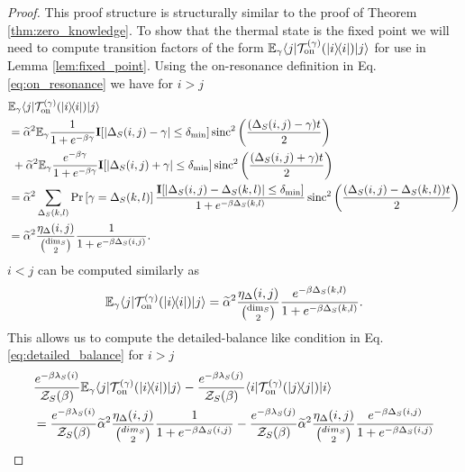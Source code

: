 \begin{proof}
This proof structure is structurally similar to the proof of Theorem \ref{thm:zero_knowledge}.
To show that the thermal state is the fixed point we will need to compute transition factors of the form $\mathbb{E}_\gamma \langle j|\mathcal{T}_{\rm on}^{(\gamma)}(| i\rangle\! \langle i|)|j\rangle$ for use in Lemma \ref{lem:fixed_point}. Using the on-resonance definition in Eq. \eqref{eq:on_resonance} we have for $i > j$
\begin{align}
    &\mathbb{E}_\gamma \langle j| \mathcal{T}_{\rm on}^{(\gamma)}(| i\rangle\! \langle i|)|j\rangle \nonumber \\
    &=  \widetilde{\alpha}^2 \mathbb{E}_{\gamma} \frac{1}{1 + e^{-\beta \gamma}} \mathbf{I}[|\Delta_S(i,j) - \gamma| \le \delta_{\min}]  \operatorname{sinc}^2\left(\frac{(\Delta_S(i,j) - \gamma)t}{2}\right) \nonumber \\
    &~+ \widetilde{\alpha}^2 \mathbb{E}_{\gamma} \frac{e^{-\beta \gamma}}{1 + e^{-\beta \gamma}} \mathbf{I}[|\Delta_S(i,j) + \gamma| \le \delta_{\min}]  \operatorname{sinc}^2\left(\frac{(\Delta_S(i,j) + \gamma)t}{2}\right) \\
    &= \widetilde{\alpha}^2 \sum_{\Delta_S(k,l)} \text{Pr}\left[ \gamma = \Delta_S(k,l) \right] \frac{\mathbf{I}[|\Delta_S(i,j) - \Delta_S(k,l)| \le \delta_{\min}]}{1 + e^{-\beta \Delta_S(k,l)}}   \operatorname{sinc}^2\left(\frac{(\Delta_S(i,j) - \Delta_S(k,l))t}{2}\right) \\
    &= \widetilde{\alpha}^2 \frac{\eta_\Delta(i,j)}{\binom{\dim_S}{2}} \frac{1}{1 + e^{-\beta \Delta_S(i,j)}}.
\end{align}
$i < j$ can be computed similarly as
\begin{equation}
    \mathbb{E}_\gamma \langle j| \mathcal{T}_{\rm on}^{(\gamma)}(| i\rangle\! \langle i|)|j\rangle = \widetilde{\alpha}^2 \frac{\eta_\Delta(i,j)}{\binom{\dim_S}{2}} \frac{e^{-\beta \Delta_S(k,l)}}{1 + e^{-\beta \Delta_S(k,l)}}.
\end{equation}
This allows us to compute the detailed-balance like condition in Eq. \eqref{eq:detailed_balance} for $i > j$
\begin{align}
    &\frac{e^{-\beta \lambda_S(i)}}{\partfun_S(\beta)} \EE_\gamma \bra{j} \TT_{\on}^{(\gamma)}(\ketbra{i}{i}) \ket{j} - \frac{e^{-\beta \lambda_S(j)}}{\partfun_S(\beta)} \bra{i} \TT_{\on}^{(\gamma)}(\ketbra{j}{j}) \ket{i} \nonumber \\
    &= \frac{e^{-\beta \lambda_S(i)}}{\partfun_S(\beta)} \widetilde{\alpha}^2 \frac{\eta_\Delta(i,j)}{\binom{dim_S}{2}} \frac{1}{1 + e^{-\beta \Delta_S(i,j)}} - \frac{e^{-\beta \lambda_S(j)}}{\partfun_S(\beta)} \widetilde{\alpha}^2 \frac{\eta_\Delta(i,j)}{\binom{dim_S}{2}} \frac{e^{-\beta \Delta_S(i,j)}}{1 + e^{-\beta \Delta_S(i,j)}} \\

\end{align}
\end{proof}

